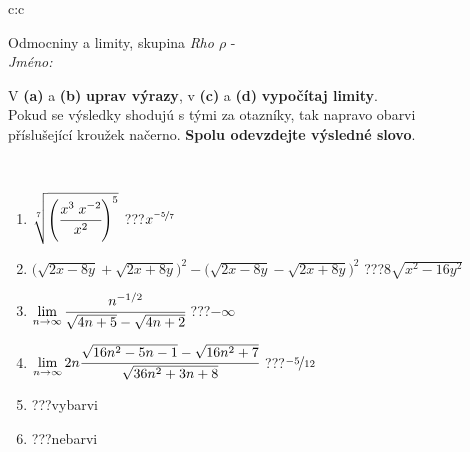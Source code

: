 \documentclass[10pt]{report}
\begin{document}
\newpage
\thispagestyle{empty}
\begin{tabular}{c:c}
\begin{minipage}[c][104.5mm][t]{0.5\linewidth}
\begin{center}
\vspace{7mm}
{\huge Odmocniny a limity, skupina \textit{Rho $\rho$} -}\\[5mm]
\textit{Jméno:}\phantom{xxxxxxxxxxxxxxxxxxxxxxxxxxxxxxxxxxxxxxxxxxxxxxxxxxxxxxxxxxxxxxxxx}\\[5mm]
\begin{minipage}{0.95\linewidth}
\begin{center}
V \textbf{(a)} a \textbf{(b)} \textbf{uprav výrazy}, v \textbf{(c)} a \textbf{(d)} \textbf{vypočítaj limity}.\\Pokud se výsledky shodujú s tými za otazníky, tak napravo obarvi\\příslušející kroužek načerno. \textbf{Spolu odevzdejte výsledné slovo}.
\end{center}
\end{minipage}
\\[1mm]
\begin{minipage}{0.79\linewidth}
\begin{center}
\begin{varwidth}{\linewidth}
\begin{enumerate}
\small
\item $\sqrt[7]{\left(\cfrac{x^{3}\;x^{-2}}{x^{2}}\right)^{5}}$\quad \dotfill\; ???\;\dotfill \quad $x^{\nicefrac{-5}{7}}$
\item {\footnotesize{\scriptsize$\big(\sqrt{2x-8y}+\sqrt{2x+8y}\big)^2-\big(\sqrt{2x-8y}-\sqrt{2x+8y}\big)^2$}\quad \dotfill\; ???\;\dotfill \quad $8\sqrt{x^2-16y^2}$}
\item $\lim\limits_{n\to\infty}\cfrac{n^{-1/2}}{\sqrt{4n+5}-\sqrt{4n+2}}$\quad \dotfill\; ???\;\dotfill \quad $-\infty$
\item $\lim\limits_{n\to\infty}2n\cfrac{\sqrt{16n^2-5n-1}-\sqrt{16n^2+7}}{\sqrt{36n^2+3n+8}}$\quad \dotfill\; ???\;\dotfill \quad $\nicefrac{-5}{12}$
\item \quad \dotfill\; ???\;\dotfill \quad vybarvi
\item \quad \dotfill\; ???\;\dotfill \quad nebarvi
\end{enumerate}
\end{varwidth}
\end{center}
\end{minipage}
\begin{minipage}{0.20\linewidth}

\end{minipage}
\end{center}
\end{minipage}
\end{tabular}
\end{document}
